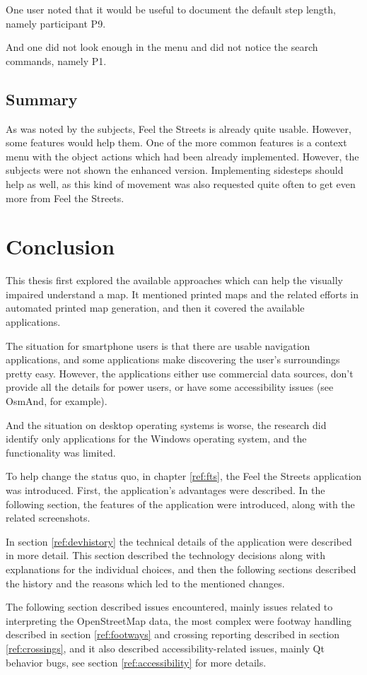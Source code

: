 \documentclass[nolof,digital]{fithesis3}
\begin{document}
One user noted that it would be useful to document the default step length, namely participant P9.

And one did not look enough in the menu and did not notice the search commands, namely P1.
\section{Summary}
As was noted by the subjects, Feel the Streets is already quite usable. However, some features would help them. One of the more common features is a context menu with the object actions which had been already implemented. However, the subjects were not shown the enhanced version. Implementing sidesteps should help as well, as this kind of movement was also requested quite often to get even more from Feel the Streets.
\chapter{Conclusion}
This thesis first explored the available approaches which can help the visually impaired understand a map. It mentioned printed maps and the related efforts in automated printed map generation, and then it covered the available applications.

The situation for smartphone users is that there are usable navigation applications, and some applications make discovering the user's surroundings pretty easy. However, the applications either use commercial data sources, don't provide all the details for power users, or have some accessibility issues (see OsmAnd, for example).

And the situation on desktop operating systems is worse, the research did identify only applications for the Windows operating system, and the functionality was limited.

To help change the status quo, in chapter \ref{ref:fts}, the Feel the Streets application was introduced. First, the application's advantages were described. In the following section, the features of the application were introduced, along with the related screenshots.

In section \ref{ref:devhistory} the technical details of the application were described in more detail. This section described the technology decisions along with explanations for the individual choices, and then the following sections described the history and the reasons which led to the mentioned changes.

The following section described issues encountered, mainly issues related to interpreting the OpenStreetMap data, the most complex were footway handling described in section \ref{ref:footways} and crossing reporting described in section \ref{ref:crossings}, and it also described accessibility-related issues, mainly Qt behavior bugs, see section \ref{ref:accessibility} for more details.
\end{document}
